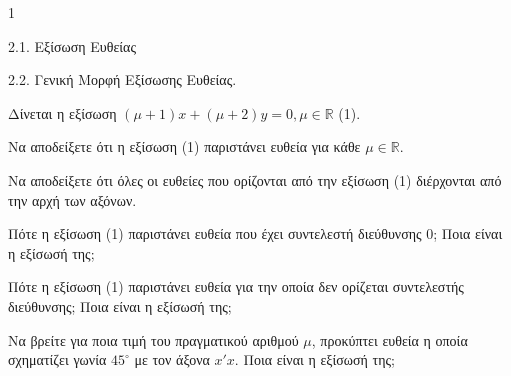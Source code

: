 \begin{ylh}{1}
    \item 2.1. Εξίσωση Ευθείας
    \item 2.2. Γενική Μορφή Εξίσωσης Ευθείας.
\end{ylh}
Δίνεται η εξίσωση $(\mu + 1)x + (\mu + 2)y = 0, \mu \in \mathbb{R}$ (1).
\begin{alist}
    \item \begin{rlist}
        \item Να αποδείξετε ότι η εξίσωση (1) παριστάνει ευθεία για κάθε $\mu \in \mathbb{R}$. 
        \item Να αποδείξετε ότι όλες οι ευθείες που ορίζονται από την εξίσωση (1) διέρχονται από την αρχή των αξόνων. 
    \end{rlist}
    \item \begin{rlist}
        \item Πότε η εξίσωση (1) παριστάνει ευθεία που έχει συντελεστή διεύθυνσης $0$; Ποια είναι η εξίσωσή της; 
        \item Πότε η εξίσωση (1) παριστάνει ευθεία για την οποία δεν ορίζεται συντελεστής διεύθυνσης; Ποια είναι η εξίσωσή της; 
    \end{rlist}
    \item Να βρείτε για ποια τιμή του πραγματικού αριθμού $\mu$, προκύπτει ευθεία η οποία σχηματίζει γωνία $45^\circ$ με τον άξονα $x'x$. Ποια είναι η εξίσωσή της; 
\end{alist}